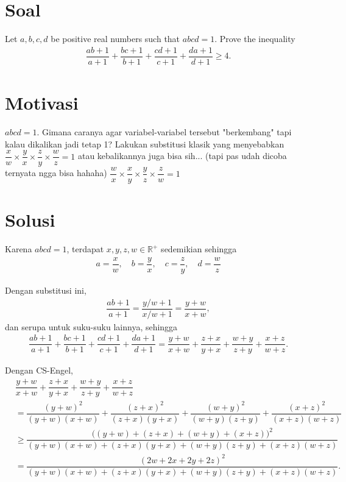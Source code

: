     \title{}
\maketitle
\section{Soal}

Let $a,b,c,d$ be positive real numbers such that $abcd = 1$. Prove the inequality
\begin{align*}
\dfrac{ab+1}{a+1} + \dfrac{bc+1}{b+1} + \dfrac{cd+1}{c+1} + \dfrac{da+1}{d+1} \geq 4.
\end{align*}

\newpage
\section{Motivasi}
$abcd = 1$. Gimana caranya agar variabel-variabel tersebut "berkembang" tapi kalau dikalikan jadi tetap 1? Lakukan substitusi klasik yang menyebabkan $\dfrac{x}{w}\times\dfrac{y}{x}\times\dfrac{z}{y}\times\dfrac{w}{z} = 1$  atau kebalikannya juga bisa sih... (tapi pas udah dicoba ternyata ngga bisa hahaha) $\dfrac{w}{x}\times\dfrac{x}{y}\times\dfrac{y}{z}\times\dfrac{z}{w} = 1$

\section{Solusi}


Karena $abcd=1$, terdapat $x,y,z,w \in \mathbb{R}^+$ sedemikian sehingga
\begin{align*}
    a = \dfrac{x}{w}, \quad b = \dfrac{y}{x}, \quad c = \dfrac{z}{y}, \quad d = \dfrac{w}{z}
\end{align*}

Dengan substitusi ini,
\begin{align*}
    \dfrac{ab+1}{a+1} = \dfrac{y/w+1}{x/w+1} = \dfrac{y+w}{x+w},
\end{align*}
dan serupa untuk suku-suku lainnya, sehingga
\begin{align*}
    \dfrac{ab+1}{a+1} + \dfrac{bc+1}{b+1} + \dfrac{cd+1}{c+1} + \dfrac{da+1}{d+1} = \dfrac{y+w}{x+w} + \dfrac{z+x}{y+x} + \dfrac{w+y}{z+y} + \dfrac{x+z}{w+z}.
\end{align*}

Dengan CS-Engel,
\begin{align*}
    &\dfrac{y+w}{x+w} + \dfrac{z+x}{y+x} + \dfrac{w+y}{z+y} + \dfrac{x+z}{w+z}\\
    &= \dfrac{(y+w)^2}{(y+w)(x+w)} + \dfrac{(z+x)^2}{(z+x)(y+x)} + \dfrac{(w+y)^2}{(w+y)(z+y)} + \dfrac{(x+z)^2}{(x+z)(w+z)}\\
    &\geq \dfrac{\big((y+w)+(z+x)+(w+y)+(x+z)\big)^2}{(y+w)(x+w)+(z+x)(y+x)+(w+y)(z+y)+(x+z)(w+z)}\\
    &= \dfrac{(2w+2x+2y+2z)^2}{(y+w)(x+w)+(z+x)(y+x)+(w+y)(z+y)+(x+z)(w+z)}.
\end{align*}

